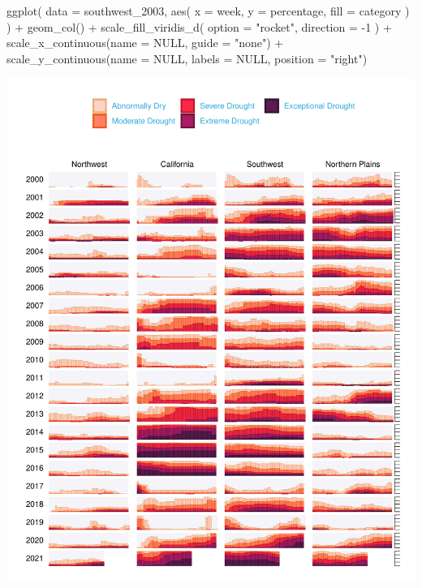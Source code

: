 \documentclass[
]{book}
\newenvironment{Shaded}{\begin{snugshade}}{\end{snugshade}}
\newcommand{\AttributeTok}[1]{\textcolor[rgb]{0.77,0.63,0.00}{#1}}
\newcommand{\ConstantTok}[1]{\textcolor[rgb]{0.00,0.00,0.00}{#1}}
\newcommand{\DecValTok}[1]{\textcolor[rgb]{0.00,0.00,0.81}{#1}}
\newcommand{\FunctionTok}[1]{\textcolor[rgb]{0.00,0.00,0.00}{#1}}
\newcommand{\NormalTok}[1]{#1}
\newcommand{\SpecialCharTok}[1]{\textcolor[rgb]{0.00,0.00,0.00}{#1}}
\newcommand{\StringTok}[1]{\textcolor[rgb]{0.31,0.60,0.02}{#1}}
\begin{document}
\begin{Shaded}
\begin{Highlighting}[]
\FunctionTok{ggplot}\NormalTok{(}
  \AttributeTok{data =}\NormalTok{ southwest\_2003,}
  \FunctionTok{aes}\NormalTok{(}
    \AttributeTok{x =}\NormalTok{ week,}
    \AttributeTok{y =}\NormalTok{ percentage,}
    \AttributeTok{fill =}\NormalTok{ category}
\NormalTok{  )}
\NormalTok{) }\SpecialCharTok{+}
  \FunctionTok{geom\_col}\NormalTok{() }\SpecialCharTok{+}
  \FunctionTok{scale\_fill\_viridis\_d}\NormalTok{(}
    \AttributeTok{option =} \StringTok{"rocket"}\NormalTok{,}
    \AttributeTok{direction =} \SpecialCharTok{{-}}\DecValTok{1}
\NormalTok{  ) }\SpecialCharTok{+}
  \FunctionTok{scale\_x\_continuous}\NormalTok{(}\AttributeTok{name =} \ConstantTok{NULL}\NormalTok{, }
                     \AttributeTok{guide =} \StringTok{"none"}\NormalTok{) }\SpecialCharTok{+}
  \FunctionTok{scale\_y\_continuous}\NormalTok{(}\AttributeTok{name =} \ConstantTok{NULL}\NormalTok{, }
                     \AttributeTok{labels =} \ConstantTok{NULL}\NormalTok{, }
                     \AttributeTok{position =} \StringTok{"right"}\NormalTok{)}
\end{Highlighting}
\end{Shaded}

\includegraphics[width=1\linewidth]{data-viz_files/figure-latex/unnamed-chunk-32-1}
\end{document}
